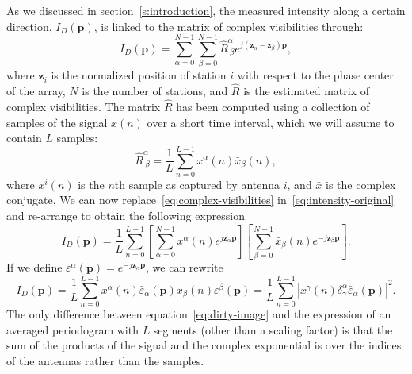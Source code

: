 \documentclass[11pt]{article}
\begin{document}
As we discussed in section~\ref{s:introduction}, the measured intensity along a certain direction, $I_{D}(\mathbf{p})$, is linked to the matrix of complex visibilities through:
\begin{equation}
    \label{eq:intensity-original}
    I_D \left(\mathbf{p}\right) =
        \sum_{\alpha = 0}^{N - 1} \sum_{\beta = 0}^{N - 1}
            \hat{R}^{\alpha}_{\ \beta}
            e^{j\left(\mathbf{z}_{\alpha}-\mathbf{z}_{\beta}\right)\mathbf{p}},
\end{equation}
where $\mathbf{z}_i$ is the normalized position of station $i$ with respect to the phase center of the array, $N$ is the number of stations, and $\hat{R}$ is the estimated matrix of complex visibilities.
The matrix $\hat{R}$ has been computed using a collection of samples of the signal $x(n)$ over a short time interval, which we will assume to contain $L$ samples:
\begin{equation}
    \label{eq:complex-visibilities}
    \hat{R}^{\alpha}_{\ \beta} =
        \frac{1}{L} \sum_{n = 0}^{L - 1} x^{\alpha}(n) \bar{x}_{\beta} (n),
\end{equation}
where $x^i(n)$ is the $n$th sample as captured by antenna $i$, and $\bar{x}$ is the complex conjugate.
We can now replace~\ref{eq:complex-visibilities} in~\ref{eq:intensity-original} and re-arrange to obtain the following expression
\begin{equation}
    I_D \left(\mathbf{p}\right) =
        \frac{1}{L}
        \sum_{n = 0}^{L - 1}
        \left[
        \sum_{\alpha = 0}^{N - 1}
        x^{\alpha}(n)
        e^{j\mathbf{z}_{\alpha}\mathbf{p}}
        \right]
        \left[
        \sum_{\beta = 0}^{N - 1}
        \bar{x}_{\beta} (n)
        e^{-j\mathbf{z}_{\beta}\mathbf{p}}
        \right].
\end{equation}
If we define $\varepsilon^{\alpha}\left(\mathbf{p}\right) = e^{-j \mathbf{z}_{\alpha} \mathbf{p}}$, we can rewrite
\begin{equation}
    \label{eq:dirty-image}
    I_D \left(\mathbf{p}\right) =
        \frac{1}{L}
        \sum_{n = 0}^{L - 1}
        x^{\alpha}(n)
        \bar{\varepsilon}_{\alpha} \left(\mathbf{p}\right)
        \bar{x}_{\beta} (n)
        \varepsilon^{\beta} \left(\mathbf{p}\right) =
        \frac{1}{L}
        \sum_{n = 0}^{L - 1}
        \left|
        x^{\gamma}(n)
        \delta^{\alpha}_{\gamma}
        \bar{\varepsilon}_{\alpha} \left(\mathbf{p}\right)
        \right|^2.
\end{equation}
The only difference between equation~\ref{eq:dirty-image} and the expression of an averaged periodogram with $L$ segments (other than a scaling factor) is that the sum of the products of the signal and the complex exponential is over the indices of the antennas rather than the samples.
\end{document}
